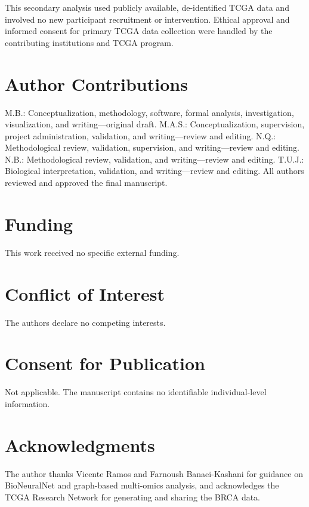 \documentclass[11pt]{article}
\begin{document}
This secondary analysis used publicly available, de-identified TCGA data and involved no new participant recruitment or intervention. Ethical approval and informed consent for primary TCGA data collection were handled by the contributing institutions and TCGA program.

\section*{Author Contributions}

M.B.: Conceptualization, methodology, software, formal analysis, investigation, visualization, and writing---original draft. M.A.S.: Conceptualization, supervision, project administration, validation, and writing---review and editing. N.Q.: Methodological review, validation, supervision, and writing---review and editing. N.B.: Methodological review, validation, and writing---review and editing. T.U.J.: Biological interpretation, validation, and writing---review and editing. All authors reviewed and approved the final manuscript.

\section*{Funding}

This work received no specific external funding.

\section*{Conflict of Interest}

The authors declare no competing interests.

\section*{Consent for Publication}

Not applicable. The manuscript contains no identifiable individual-level information.

\section*{Acknowledgments}

The author thanks Vicente Ramos and Farnoush Banaei-Kashani for guidance on BioNeuralNet and graph-based multi-omics analysis, and acknowledges the TCGA Research Network for generating and sharing the BRCA data.

\appendix
\end{document}
